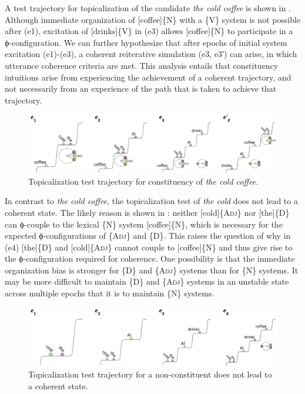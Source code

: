   A test trajectory for topicalization of the candidate \textit{the cold coffee} is shown in {}. Although immediate organization of [coffee]\{N\} with a \{V\} system is not possible after (e1), excitation of [drinks]\{V\} in (e3) allows [coffee]\{N\} to participate in a ϕ-configuration. We can further hypothesize that after epochs of initial system excitation (e1)-(e3), a coherent reiterative simulation (e3, e3′) can arise, in which utterance coherence criteria are met. This analysis entails that constituency intuitions arise from experiencing the achievement of a coherent trajectory, and not necessarily from an experience of the path that is taken to achieve that trajectory.

  
\begin{figure}
\includegraphics[width=\textwidth]{figures/Tilsen-img138.png}
\caption{Topicalization test trajectory for constituency of \textit{the cold coffee}.}
\label{fig:6:19}
\end{figure}
 

  In contrast to \textit{the cold coffee}, the topicalization test of \textit{the cold} does not lead to a coherent state. The likely reason is shown in {}: neither [cold]\{A\textsc{dj}\} nor [the]\{D\} can ϕ-couple to the lexical \{N\} system [coffee]\{N\}, which is necessary for the expected ϕ-configurations of \{A\textsc{dj}\} and \{D\}. This raises the question of why in (e4) [the]\{D\} and [cold]\{A\textsc{dj}\} cannot couple to [coffee]\{N\} and thus give rise to the ϕ-configuration required for coherence. One possibility is that the immediate organization bias is stronger for \{D\} and \{A\textsc{dj}\} systems than for \{N\} systems. It may be more difficult to maintain \{D\} and \{A\textsc{dj}\} systems in an unstable state across multiple epochs that it is to maintain \{N\} systems.

  
\begin{figure}
\includegraphics[width=\textwidth]{figures/Tilsen-img139.png}
\caption{Topicalization test trajectory for a non-constituent does not lead to a coherent state.}
\label{fig:6:20}
\end{figure}
 

